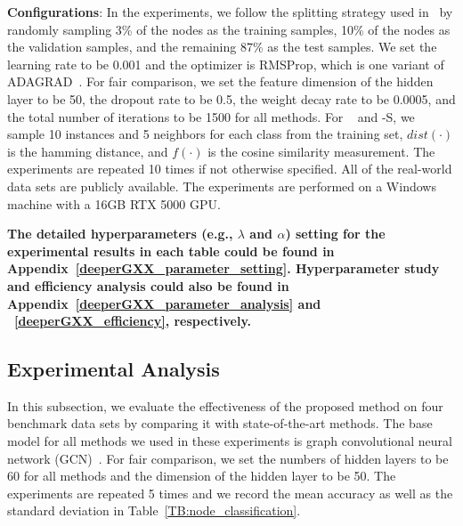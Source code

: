\noindent\textbf{Configurations}: In the experiments, we follow the splitting strategy used in~\citep{DBLP:conf/iclr/ZhaoA20} by randomly sampling 3\% of the nodes as the training samples, 10\% of the nodes as the validation samples, and the remaining 87\% as the test samples. We set the learning rate to be 0.001 and the optimizer is RMSProp, which is one variant of ADAGRAD~\citep{DBLP:journals/jmlr/DuchiHS11}. For fair comparison, we set the feature dimension of the hidden layer to be 50, the dropout rate to be 0.5, the weight decay rate to be 0.0005, and the total number of iterations to be 1500 for all methods. For \name~ and \name-S, we sample 10 instances and 5 neighbors for each class from the training set, $dist(\cdot)$ is the hamming distance, and $f(\cdot)$ is the cosine similarity measurement. The experiments are repeated 10 times if not otherwise specified.
All of the real-world data sets are publicly available. The experiments are performed on a Windows machine with a 16GB RTX 5000 GPU. 

\textbf{The detailed hyperparameters (e.g., $\lambda$ and $\alpha$) setting for the experimental results in each table could be found in Appendix~\ref{deeperGXX_parameter_setting}. Hyperparameter study and efficiency analysis could also be found in Appendix~\ref{deeperGXX_parameter_analysis} and ~\ref{deeperGXX_efficiency}, respectively.}


















\subsection{Experimental Analysis}
In this subsection, we evaluate the effectiveness of the proposed method on four benchmark data sets by comparing it with state-of-the-art methods. The base model for all methods we used in these experiments is graph convolutional neural network (GCN)~\citep{DBLP:conf/iclr/KipfW17}. For fair comparison, we set the numbers of hidden layers to be 60 for all methods and the dimension of the hidden layer to be 50. The experiments are repeated 5 times and we record the mean accuracy as well as the standard deviation in Table~\ref{TB:node_classification}. 


